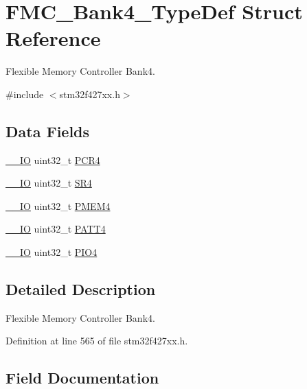 \hypertarget{struct_f_m_c___bank4___type_def}{}\section{F\+M\+C\+\_\+\+Bank4\+\_\+\+Type\+Def Struct Reference}
\label{struct_f_m_c___bank4___type_def}


Flexible Memory Controller Bank4.  




{\ttfamily \#include $<$stm32f427xx.\+h$>$}

\subsection*{Data Fields}
\begin{DoxyCompactItemize}
\item 
\hyperlink{core__sc300_8h_aec43007d9998a0a0e01faede4133d6be}{\+\_\+\+\_\+\+IO} uint32\+\_\+t \hyperlink{struct_f_m_c___bank4___type_def_a2f02e7acfbd7e549ede84633215eb6a1}{P\+C\+R4}
\item 
\hyperlink{core__sc300_8h_aec43007d9998a0a0e01faede4133d6be}{\+\_\+\+\_\+\+IO} uint32\+\_\+t \hyperlink{struct_f_m_c___bank4___type_def_a8218d6e11dae5d4468c69303dec0b4fc}{S\+R4}
\item 
\hyperlink{core__sc300_8h_aec43007d9998a0a0e01faede4133d6be}{\+\_\+\+\_\+\+IO} uint32\+\_\+t \hyperlink{struct_f_m_c___bank4___type_def_a3f82cc749845fb0dd7dfa8121d96b663}{P\+M\+E\+M4}
\item 
\hyperlink{core__sc300_8h_aec43007d9998a0a0e01faede4133d6be}{\+\_\+\+\_\+\+IO} uint32\+\_\+t \hyperlink{struct_f_m_c___bank4___type_def_a955cad1aab7fb2d5b6e216cb29b5e7e2}{P\+A\+T\+T4}
\item 
\hyperlink{core__sc300_8h_aec43007d9998a0a0e01faede4133d6be}{\+\_\+\+\_\+\+IO} uint32\+\_\+t \hyperlink{struct_f_m_c___bank4___type_def_ac53cd7a08093a4ae8f4de4bcff67a64f}{P\+I\+O4}
\end{DoxyCompactItemize}


\subsection{Detailed Description}
Flexible Memory Controller Bank4. 

Definition at line 565 of file stm32f427xx.\+h.



\subsection{Field Documentation}

